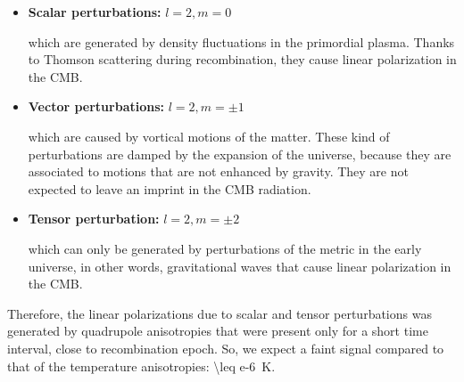 \begin{itemize}
        \item \textbf{Scalar perturbations:} $l = 2, m = 0$

        which are generated by density fluctuations in the primordial
        plasma. Thanks to Thomson scattering during recombination, they
        cause linear polarization in the CMB.

        \item \textbf{Vector perturbations:} $l = 2, m = \pm 1$

        which are caused by vortical motions of the matter. These kind of
        perturbations are damped by the expansion of the universe, because
        they are associated to motions that are not enhanced by gravity.
        They are not expected to leave an imprint in the CMB radiation.

        \item \textbf{Tensor perturbation:} $l = 2, m = \pm 2$

        which can only be generated by perturbations of the metric in the
        early universe, in other words, gravitational waves that cause
        linear polarization in the CMB.
\end{itemize}

Therefore, the linear polarizations due to scalar and tensor perturbations was
generated by quadrupole anisotropies that were present only for a short time
interval, close to recombination epoch. So, we expect a faint signal compared to
that of the temperature anisotropies: \SI{\leq e-6}{\kelvin}.
